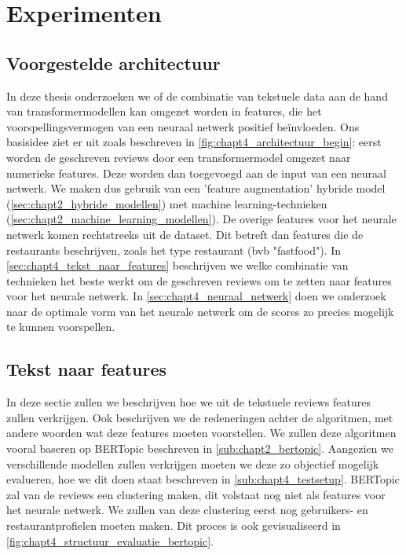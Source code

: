 \chapter{Experimenten}

\section{Voorgestelde architectuur}
In deze thesis onderzoeken we of de combinatie van tekstuele data aan de hand van transformermodellen kan omgezet worden in features, die het voorspellingsvermogen van een neuraal netwerk positief beïnvloeden. Ons basisidee ziet er uit zoals beschreven in \autoref{fig:chapt4_architectuur_begin}: eerst worden de geschreven reviews door een transformermodel omgezet naar numerieke features. Deze worden dan toegevoegd aan de input van een neuraal netwerk. We maken dus gebruik van een 'feature augmentation'  hybride model (\ref{sec:chapt2_hybride_modellen}) met machine learning-technieken (\ref{sec:chapt2_machine_learning_modellen}). De overige features voor het neurale netwerk komen rechtstreeks uit de dataset. Dit betreft dan features die de restaurants beschrijven, zoals het type restaurant (bvb "fastfood"). In \autoref{sec:chapt4_tekst_naar_features} beschrijven we welke combinatie van technieken het beste werkt om de geschreven reviews om te zetten naar features voor het neurale netwerk. In \autoref{sec:chapt4_neuraal_netwerk} doen we onderzoek naar de optimale vorm van het neurale netwerk om de scores zo precies mogelijk te kunnen voorspellen.


\section{Tekst naar features}
\label{sec:chapt4_tekst_naar_features}
In deze sectie zullen we beschrijven hoe we uit de tekstuele reviews features zullen verkrijgen. Ook beschrijven we de redeneringen achter de algoritmen, met andere woorden wat deze features moeten voorstellen. We zullen deze algoritmen vooral baseren op BERTopic beschreven in \autoref{sub:chapt2_bertopic}. Aangezien we verschillende modellen zullen verkrijgen moeten we deze zo objectief mogelijk evalueren, hoe we dit doen staat beschreven in \autoref{sub:chapt4_testsetup}. BERTopic zal van de reviews een clustering maken, dit volstaat nog niet als features voor het neurale netwerk. We zullen van deze clustering eerst nog gebruikers- en restaurantprofielen moeten maken. Dit proces is ook gevisualiseerd in \autoref{fig:chapt4_structuur_evaluatie_bertopic}.

